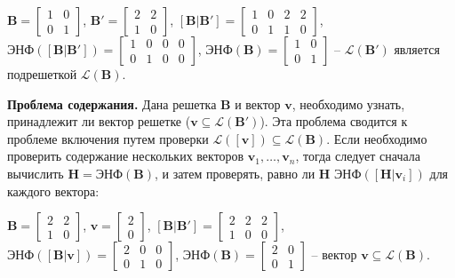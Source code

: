 $ \mathbf{B} = \left[\begin{array}{cccc}
1 & 0 \\
0 & 1
\end{array}\right] $, 
$ \mathbf{B}' = \left[\begin{array}{cccc}
2 & 2 \\
1 & 0
\end{array}\right] $, 
$ \left[\mathbf{B} | \mathbf{B}'\right] = \left[\begin{array}{cccc}
1 & 0 & 2 & 2 \\
0 & 1 & 1 & 0
\end{array}\right] $, 
$ \text{ЭНФ}(\left[\mathbf{B} | \mathbf{B}' \right]) = \left[\begin{array}{cccc}
1 & 0 & 0 & 0 \\
0 & 1 & 0 & 0
\end{array}\right] $,
$ \text{ЭНФ}(\mathbf{B}) = \left[\begin{array}{cccc}
1 & 0 \\
0 & 1
\end{array}\right] $ -- $ \mathcal{L}(\mathbf{B}') $ является подрешеткой $ \mathcal{L}(\mathbf{B}) $.

\textbf{Проблема содержания.} Дана решетка $ \mathbf{B} $ и вектор $ \mathbf{v} $, необходимо узнать, принадлежит ли вектор решетке ($ \mathbf{v} \subseteq \mathcal{L}(\mathbf{B}') $). Эта проблема сводится к проблеме включения путем проверки $ \mathcal{L}(\left[\mathbf{v}\right]) \subseteq \mathcal{L}(\mathbf{B}) $. Если необходимо проверить содержание нескольких векторов $ \mathbf{v}_1, \ldots, \mathbf{v}_n $, тогда следует сначала вычислить $ \mathbf{H} = \text{ЭНФ}(\mathbf{B}) $, и затем проверять, равно ли $ \mathbf{H} $ $ \text{ЭНФ}(\left[\mathbf{H} | \mathbf{v}_i \right]) $ для каждого вектора:

$ \mathbf{B} = \left[\begin{array}{cccc}
2 & 2 \\
1 & 0
\end{array}\right] $, 
$ \mathbf{v} = \left[\begin{array}{cccc}
2 \\
0
\end{array}\right] $, 
$ \left[\mathbf{B} | \mathbf{B}'\right] = \left[\begin{array}{cccc}
2 & 2 & 2 \\
1 & 0 & 0
\end{array}\right] $, 
$ \text{ЭНФ}(\left[\mathbf{B} | \mathbf{v} \right]) = \left[\begin{array}{cccc}
2 & 0 & 0 \\
0 & 1 & 0
\end{array}\right] $,
$ \text{ЭНФ}(\mathbf{B}) = \left[\begin{array}{cccc}
2 & 0 \\
0 & 1
\end{array}\right] $ -- вектор $ \mathbf{v} \subseteq \mathcal{L}(\mathbf{B}) $.


